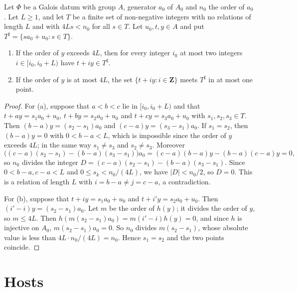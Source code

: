 \begin{lemma}\label{hf-thick-orbits}
Let $\Phi$ be a Galois datum with group $A$, generator $a_0$ of $A_0$ and $n_0$ the order of $a_0$. Let
$L\geq1$, and let $T$ be a finite set of non-negative integers with no relations of length $L$ and
with $4Ls<n_0$ for all $s\in T$. Let $u_0,t,y\in A$ and put $T^\sharp=\{sa_0+u_0:s\in T\}$.
\begin{enumerate}
\item If the order of $y$ exceeds $4L$, then for every integer $i_0$ at most two integers
  $i\in[i_0,i_0+L)$ have $t+iy\in T^\sharp$.
\item If the order of $y$ is at most $4L$, the set $\{t+iy:i\in\mathbf Z\}$ meets $T^\sharp$ in at
  most one point.
\end{enumerate}
\end{lemma}

\begin{proof}
For (a), suppose that $a<b<c$ lie in $[i_0,i_0+L)$ and that $t+ay=s_1a_0+u_0$, $t+by=s_2a_0+u_0$ and
$t+cy=s_3a_0+u_0$ with $s_1,s_2,s_3\in T$. Then $(b-a)y=(s_2-s_1)a_0$ and $(c-a)y=(s_3-s_1)a_0$. If
$s_1=s_2$, then $(b-a)y=0$ with $0<b-a<L$, which is impossible since the order of $y$ exceeds $4L$;
in the same way $s_1\neq s_3$ and $s_2\neq s_3$. Moreover
\[
 \bigl((c-a)(s_2-s_1)-(b-a)(s_3-s_1)\bigr)a_0=(c-a)(b-a)y-(b-a)(c-a)y=0,
\]
so $n_0$ divides the integer $D=(c-a)(s_2-s_1)-(b-a)(s_3-s_1)$. Since $0<b-a,c-a<L$ and
$0\leq s_k<n_0/(4L)$, we have $|D|<n_0/2$, so $D=0$. This is a relation of length $L$ with
$i=b-a\neq j=c-a$, a contradiction.

For (b), suppose that $t+iy=s_1a_0+u_0$ and $t+i'y=s_2a_0+u_0$. Then $(i'-i)y=(s_2-s_1)a_0$. Let $m$
be the order of $h(y)$; it divides the order of $y$, so $m\leq4L$. Then
$h(m(s_2-s_1)a_0)=m(i'-i)h(y)=0$, and since $h$ is injective on $A_0$, $m(s_2-s_1)a_0=0$. So $n_0$
divides $m(s_2-s_1)$, whose absolute value is less than $4L\cdot n_0/(4L)=n_0$. Hence $s_1=s_2$ and
the two points coincide.
\end{proof}

\section{Hosts}\label{section-hf-hosts}

